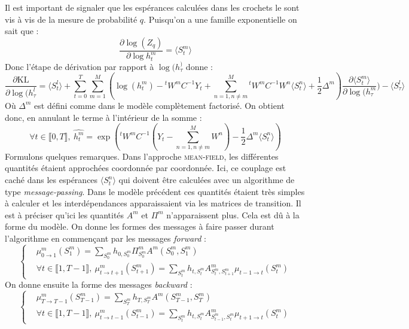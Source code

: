 \documentclass[10pt,a4paper]{article}
\newcommand{\meanfield}{\textsc{mean-field}}
\begin{document}
Il est important de signaler que les espérances calculées dans les crochets le sont vis à vis de la mesure de probabilité $q$.
Puisqu'on a une famille exponentielle on sait que :
\begin{equation}
\frac{\partial \log(Z_q)}{\partial \log h_t^m} = \langle S_t^m \rangle
\end{equation}
Donc l'étape de dérivation par rapport à $\log(h_{\tau}^)$ donne :
\begin{equation}
\frac{\partial \text{KL}}{\partial \log(h_{\tau}^l} = \langle S_t^l \rangle + \underset{t=0}{\overset{T}{\sum}} \underset{m=1}{\overset{M}{\sum}} \left( \log(h_t^m) -{}^t W^mC^{-1}Y_t + \underset{n=1, n \neq m}{\overset{M}{\sum}}{}^t W^m C^{-1} W^n \langle S_t^n \rangle + \frac{1}{2}\Delta^m \right) \frac{\partial \langle S_t^m \rangle}{\partial \log(h_{\tau}^m})-\langle S_{\tau}^l \rangle
\end{equation}
Où $\Delta^m$ est défini comme dans le modèle complètement factorisé. On obtient donc, en annulant le terme à l'intérieur de la somme :
\begin{equation}
\forall t \in \llbracket 0,T \rrbracket, \ \hat{h_t^m} = \exp \left( {}^tW^mC^{-1} \left( Y_t - \underset{n=1, n \neq m}{\overset{M}{\sum}} W^n \right) -\frac{1}{2} \Delta^m \langle S_t^n \rangle \right)
\end{equation}
Formulons quelques remarques. Dans l'approche \meanfield, les différentes quantités étaient approchées coordonnée par coordonnée. Ici, ce couplage est caché dans les espérances $\langle S_t^n \rangle$ qui doivent être calculées avec un algorithme de type \textit{message-passing}. Dans le modèle précédent ces quantités étaient très simples à calculer et les interdépendances apparaissaient via les matrices de transition. Il est à préciser qu'ici les quantités $A^m$ et $\Pi^m$ n'apparaissent plus. Cela est dû à la forme du modèle. On donne les formes des messages à faire passer durant l'algorithme en commençant par les messages \textit{forward} :
\begin{equation}
\left \lbrace
\begin{aligned}
& \mu_{0 \rightarrow 1}^m(S_1^m) = \underset{S_0^m}{\sum} h_{0,S_0^m} \Pi^m_{S_0^m} A^m(S_0^m, S_1^m) \\
&\forall t \in \llbracket 1,T-1 \rrbracket, \ \mu_{t \rightarrow t+1}^m(S_{t+1}^m)=\underset{S_t^m}{\sum} h_{t,S_t^m} A_{S_t^m,S_{t+1}^m}^m \mu_{t-1 \rightarrow t}(S_t^m)
\end{aligned}
\right.
\end{equation}
On donne ensuite la forme des messages \textit{backward} : 
\begin{equation}
\left \lbrace
\begin{aligned}
& \mu_{T \rightarrow T-1}^m(S_{T-1}^m) = \underset{S_T^m}{\sum} h_{T,S_T^m} A^m(S_{T-1}^m, S_T^m) \\
&\forall t \in \llbracket 1,T-1 \rrbracket, \ \mu_{t \rightarrow t-1}^m(S_{t-1}^m)=\underset{S_t^m}{\sum} h_{t,S_t^m} A_{S_{t-1}^m,S_{t}^m}^m \mu_{t+1 \rightarrow t}(S_t^m)
\end{aligned}
\right.
\end{equation}
\end{document}
